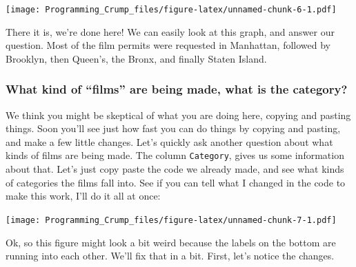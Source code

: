 \documentclass[]{book}
\newenvironment{Shaded}{\begin{snugshade}}{\end{snugshade}}
\newcommand{\KeywordTok}[1]{\textcolor[rgb]{0.13,0.29,0.53}{\textbf{{#1}}}}
\newcommand{\DataTypeTok}[1]{\textcolor[rgb]{0.13,0.29,0.53}{{#1}}}
\newcommand{\DecValTok}[1]{\textcolor[rgb]{0.00,0.00,0.81}{{#1}}}
\newcommand{\StringTok}[1]{\textcolor[rgb]{0.31,0.60,0.02}{{#1}}}
\newcommand{\NormalTok}[1]{{#1}}
\theoremstyle{definition}
\theoremstyle{definition}
\theoremstyle{definition}
\theoremstyle{remark}
\begin{document}
\texttt{[image: Programming\_Crump\_files/figure-latex/unnamed-chunk-6-1.pdf]}

There it is, we're done here! We can easily look at this graph, and
answer our question. Most of the film permits were requested in
Manhattan, followed by Brooklyn, then Queen's, the Bronx, and finally
Staten Island.

\subsubsection{\texorpdfstring{What kind of ``films'' are being made,
what is the
category?}{What kind of films are being made, what is the category?}}\label{what-kind-of-films-are-being-made-what-is-the-category}

We think you might be skeptical of what you are doing here, copying and
pasting things. Soon you'll see just how fast you can do things by
copying and pasting, and make a few little changes. Let's quickly ask
another question about what kinds of films are being made. The column
\texttt{Category}, gives us some information about that. Let's just copy
paste the code we already made, and see what kinds of categories the
films fall into. See if you can tell what I changed in the code to make
this work, I'll do it all at once:

\begin{Shaded}
\end{Shaded}

\texttt{[image: Programming\_Crump\_files/figure-latex/unnamed-chunk-7-1.pdf]}

Ok, so this figure might look a bit weird because the labels on the
bottom are running into each other. We'll fix that in a bit. First,
let's notice the changes.
\end{document}
